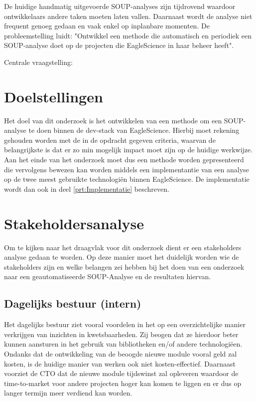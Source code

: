De huidige handmatig uitgevoerde SOUP-analyses zijn tijdrovend waardoor ontwikkelaars andere taken moeten laten vallen. Daarnaast wordt de analyse niet frequent genoeg gedaan en vaak enkel op inplanbare momenten. De probleemstelling luidt: "Ontwikkel een methode die automatisch en periodiek een SOUP-analyse doet op de projecten die EagleScience in haar beheer heeft".

Centrale vraagstelling:





\section{Doelstellingen}\label{sec:doelstellingen}
Het doel van dit onderzoek is het ontwikkelen van een methode om een SOUP-analyse te doen binnen de dev-stack van EagleScience. Hierbij moet rekening gehouden worden met de in de opdracht gegeven criteria, waarvan de belangrijkste is dat er zo min mogelijk impact moet zijn op de huidige werkwijze. Aan het einde van het onderzoek moet dus een methode worden gepresenteerd die vervolgens bewezen kan worden middels een implementantie van een  analyse op de twee meest gebruikte technologiën binnen EagleScience. De implementatie wordt dan ook in deel \ref{prt:Implementatie} beschreven.


\section{Stakeholdersanalyse}\label{sec:stakeholdersanalyse}
Om te kijken naar het draagvlak voor dit onderzoek dient er een stakeholders analyse gedaan te worden. Op deze manier moet het duidelijk worden wie de stakeholders zijn en welke belangen zei hebben bij het doen van een onderzoek naar een geautomatiseerde SOUP-Analyse en de resultaten hiervan.

\subsection{Dagelijks bestuur (intern)}\label{subsec:dagelijks-bestuur-(intern)1}
Het dagelijks bestuur ziet vooral voordelen in het op een overzichtelijke manier verkrijgen van inzichten in kwetsbaarheden. Zij beogen dat ze hierdoor beter kunnen aansturen in het gebruik van bibliotheken en/of andere technologiëen. Ondanks dat de ontwikkeling van de beoogde nieuwe module vooral geld zal kosten, is de huidige manier van werken ook niet kosten-effectief. Daarnaast voorziet de CTO dat de nieuwe module tijdswinst zal opleveren waardoor de time-to-market voor andere projecten hoger kan komen te liggen en er dus op langer termijn meer verdiend kan worden.


